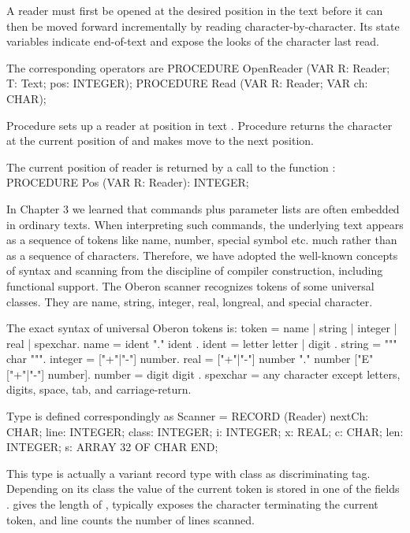 \noindent A reader must first be opened at the desired position in the text
before it can then be moved forward incrementally by reading
character-by-character. Its state variables indicate end-of-text and
expose the looks of the character last read.

The corresponding operators are
\begintt
PROCEDURE OpenReader (VAR R: Reader; T: Text; pos: INTEGER);
PROCEDURE Read (VAR R: Reader; VAR ch: CHAR);
\endtt

\noindent Procedure  sets up a reader  at position  in text
. Procedure  returns the character at the current position of 
and makes  move to the next position.

\noindent The current position of reader  is returned by a call to the function :
\begintt
PROCEDURE Pos (VAR R: Reader): INTEGER;
\endtt

\noindent In Chapter 3 we learned that commands plus parameter lists are often
embedded in ordinary texts. When interpreting such commands, the
underlying text appears as a sequence of tokens like name, number,
special symbol etc. much rather than as a sequence of
characters. Therefore, we have adopted the well-known concepts of
syntax and scanning from the discipline of compiler construction,
including functional support. The Oberon scanner recognizes tokens of
some universal classes. They are name, string, integer, real,
longreal, and special character.

The exact syntax of universal Oberon tokens is:
\begintt
token = name | string | integer | real | spexchar.
name = ident { "." ident }.
ident = letter { letter | digit }.
string = """ { char } """.
integer = ["+"|"-"] number.
real = ["+"|"-"] number "." number ["E" ["+"|"-"] number].
number = digit { digit }.
spexchar = any character except letters, digits, space, tab, and carriage-return.
\endtt

\noindent Type  is defined correspondingly as
\begintt
Scanner = RECORD (Reader)
  nextCh: CHAR;
  line: INTEGER;
  class: INTEGER;
  i: INTEGER;
  x: REAL;
  c: CHAR;
  len: INTEGER;
  s: ARRAY 32 OF CHAR
END;
\endtt

\noindent This type is actually a variant record type with class as
discriminating tag. Depending on its class the value of the current
token is stored in one of the fields .  gives the length of ,  typically exposes the character terminating the current token, and line counts the number of lines scanned.

